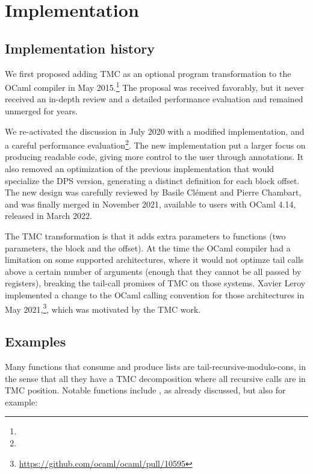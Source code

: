 \section{\OCaml Implementation}
\label{sec:implementation}

\subsection{Implementation history}

We first proposed adding TMC as an optional program transformation to
the OCaml compiler in
May 2015.\footnote{}
The proposal was received favorably, but it never received an in-depth
review and a detailed performance evaluation and remained unmerged for
years.

We re-activated the discussion in July 2020 with a modified
implementation, and a careful performance
evaluation\footnote{}. The
new implementation put a larger focus on producing readable code,
giving more control to the user through annotations. It also removed
an optimization of the previous implementation that would specialize
the DPS version, generating a distinct definition for each block
offset. The new design was carefully reviewed by Basile Clément and
Pierre Chambart, and was finally merged in November 2021, available to
users with OCaml 4.14, released in March 2022.

The TMC transformation is that it adds extra parameters to functions
(two parameters, the block and the offset). At the time the OCaml
compiler had a limitation on some supported architectures, where it
would not optimze tail calls above a certain number of arguments
(enough that they cannot be all passed by registers), breaking the
tail-call promises of TMC on those systems. Xavier Leroy implemented
a change to the OCaml calling convention for those architectures in
May 2021,\footnote{\url{https://github.com/ocaml/ocaml/pull/10595}},
which was motivated by the TMC work.

\subsection{Examples}

Many functions that consume and produce lists are
tail-recursive-modulo-cons, in the sense that all they have a TMC
decomposition where all recursive calls are in TMC position. Notable
functions include , as already discussed, but also for
example:


